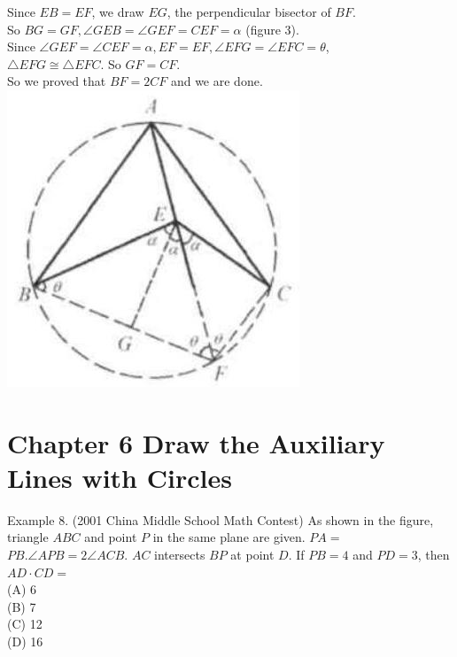 \documentclass[10pt]{article}
\begin{document}
Since \(E B=E F\), we draw \(E G\), the perpendicular bisector of \(B F\).\\
So \(B G=G F, \angle G E B=\angle G E F=C E F=\alpha\) (figure 3).\\
Since \(\angle G E F=\angle C E F=\alpha, E F=E F, \angle E F G=\angle E F C=\theta\),\\
\(\triangle E F G \cong \triangle E F C\). So \(G F=C F\).\\
So we proved that \(B F=2 C F\) and we are done.\\
\includegraphics[max width=\textwidth, center]{2025_04_17_97bc1f7e44d93c271a88g-202(3)}

\section*{Chapter 6 Draw the Auxiliary Lines with Circles}
Example 8. (2001 China Middle School Math Contest) As shown in the figure, triangle \(A B C\) and point \(P\) in the same plane are given. \(P A=\) \(P B . \angle A P B=2 \angle A C B\). \(A C\) intersects \(B P\) at point \(D\). If \(P B=4\) and \(P D=3\), then \(A D \cdot C D=\)\\
(A) 6\\
(B) 7\\
(C) 12\\
(D) 16
\end{document}
